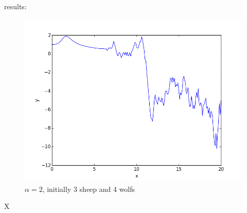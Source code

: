 results:

\begin{figure}[!ht]
\includegraphics[width=1\textwidth]{chapters/images/figure-7-16}
\caption{$\alpha = 2$, initially 3 sheep and 4 wolfs}
\end{figure}




X


